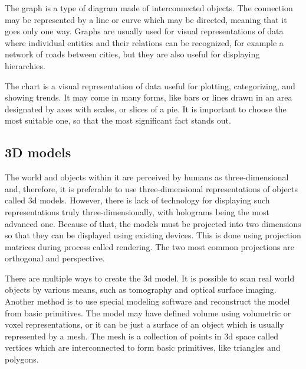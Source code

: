 The graph is a type of diagram made of interconnected objects. The connection
may be represented by a line or curve which may be directed, meaning that it
goes only one way. Graphs are usually used for visual representations of data
where individual entities and their relations can be recognized, for example a
network of roads between cities, but they are also useful for displaying
hierarchies.

The chart is a visual representation of data useful for plotting, categorizing,
and showing trends. It may come in many forms, like bars or lines drawn in an
area designated by axes with scales, or slices of a pie. It is important to choose
the most suitable one, so that the most significant fact stands out.

\subsection{3D models}
The world and objects within it are perceived by humans as three-dimensional
and, therefore, it is preferable to use three-dimensional representations of
objects called \gls{3d} models. However, there is lack of technology for displaying
such representations truly three-dimensionally, with holograms being the most
advanced one. Because of that, the models must be projected into two dimensions
so that they can be displayed using existing devices. This is done using
projection matrices during process called rendering. The two most common
projections are orthogonal and perspective.

There are multiple ways to create the \gls{3d} model. It is possible to scan real
world objects by various means, such as tomography and optical surface imaging.
Another method is to use special modeling software and reconstruct the model from basic
primitives. The model may have defined volume using volumetric or voxel
representations, or it can be just a surface of an object which is usually
represented by a mesh. The mesh is a collection of points in \gls{3d} space called vertices
which are interconnected to form basic primitives, like triangles and polygons.

